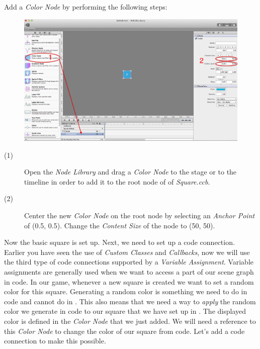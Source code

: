 \begin{leftbar}
Add a \textit{Color Node} by performing the following steps:
\begin{figure}[H]
		\centering
		\includegraphics[width=0.9\linewidth]{images/firstproject/square_add_colornode.png}
\end{figure}
\begin{description}
\item[(1)] Open the \textit{Node Library} and drag a \textit{Color Node} to the
stage or to the timeline in order to add it to the root node of of
\textit{Square.ccb}.
\item[(2)] Center the new \textit{Color Node} on the root node by selecting an
\textit{Anchor Point} of (0.5, 0.5). Change the \textit{Content Size} of the
node to (50, 50).
\end{description}
\end{leftbar}

Now the basic square is set up. Next, we need to set up a code connection. Earlier you have seen
the use of \textit{Custom Classes} and \textit{Callbacks}, now we will use the
third type of code connections supported by \SB{} a \textit{Variable
Assignment}. Variable assignments
are generally used when we want to access a part of our scene graph in code. In
our game, whenever a new square is created we want to set a random color for
this square. Generating a random color is something we need to do in code and
cannot do in \SB{}. This also means that we need a way to \textit{apply} the random color we
generate in code to our square that we have set up in \SB{}. The displayed color
is defined in the \textit{Color Node} that we just added. We will need a
reference to this \textit{Color Node} to change the color of our square from
code. Let's add a code connection to make this possible.

